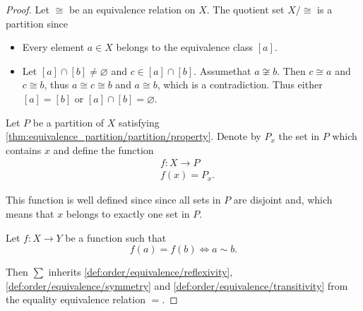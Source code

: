 \begin{proof}
   Let \( \cong \) be an equivalence relation on \( X \). The quotient set \( X / \cong \) is a partition since
  \begin{itemize}
    \item Every element \( a \in X \) belongs to the equivalence class \( [a] \).
    \item Let \( [a] \cap [b] \neq \varnothing \) and \( c \in [a] \cap [b] \). Assume\LEM that \( a \not\cong b \). Then \( c \cong a \) and \( c \cong b \), thus \( a \cong c \cong b \) and \( a \cong b \), which is a contradiction. Thus either \( [a] = [b] \) or \( [a] \cap [b] = \varnothing \).
  \end{itemize}

   Let \( P \) be a partition of \( X \) satisfying \cref{thm:equivalence_partition/partition/property}. Denote by \( P_x \) the set in \( P \) which contains \( x \) and define the function
  \begin{align*}
    &f: X \to P \\
    &f(x) = P_x.
  \end{align*}

  This function is well defined since since all sets in \( P \) are disjoint and, which means that \( x \) belongs to exactly one set in \( P \).

   Let \( f: X \to Y \) be a function such that
  \begin{equation*}
    f(a) = f(b) \iff a \sim b.
  \end{equation*}

  Then \( \sum \) inherits \cref{def:order/equivalence/reflexivity}, \cref{def:order/equivalence/symmetry} and \cref{def:order/equivalence/transitivity} from the equality equivalence relation \( = \).
\end{proof}

